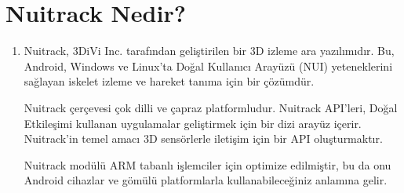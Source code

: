\documentclass[12pt, a4paper]{article}
\begin{document}
	\section{Nuitrack Nedir?}
	\begin{enumerate}
		\item Nuitrack, 3DiVi Inc. tarafından geliştirilen bir 3D izleme ara yazılımıdır. Bu, Android, Windows ve Linux'ta Doğal Kullanıcı Arayüzü (NUI) yeteneklerini sağlayan iskelet izleme ve hareket tanıma için bir çözümdür.
		
		Nuitrack çerçevesi çok dilli ve çapraz platformludur. Nuitrack API'leri, Doğal Etkileşimi kullanan uygulamalar geliştirmek için bir dizi arayüz içerir. Nuitrack'in temel amacı 3D sensörlerle iletişim için bir API oluşturmaktır.
		
		Nuitrack modülü ARM tabanlı işlemciler için optimize edilmiştir, bu da onu Android cihazlar ve gömülü platformlarla kullanabileceğiniz anlamına gelir.\cite{3DiVi}	
		
		
		
	\end{enumerate}
	\newpage
	
\end{document}
